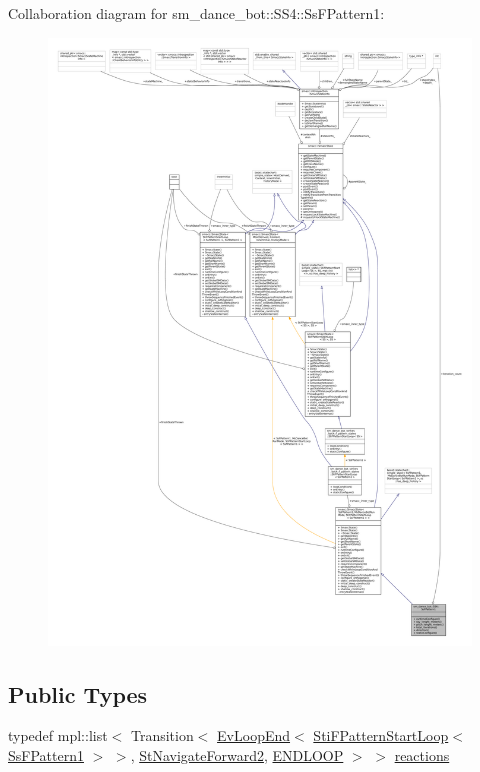Collaboration diagram for sm\+\_\+dance\+\_\+bot\+:\+:S\+S4\+:\+:Ss\+F\+Pattern1\+:
\nopagebreak
\begin{figure}[H]
\begin{center}
\leavevmode
\includegraphics[width=350pt]{structsm__dance__bot_1_1SS4_1_1SsFPattern1__coll__graph}
\end{center}
\end{figure}
\subsection*{Public Types}
\begin{DoxyCompactItemize}
\item 
typedef mpl\+::list$<$ Transition$<$ \hyperlink{structsmacc_1_1default__events_1_1EvLoopEnd}{Ev\+Loop\+End}$<$ \hyperlink{structsm__dance__bot_1_1f__pattern__states_1_1StiFPatternStartLoop}{Sti\+F\+Pattern\+Start\+Loop}$<$ \hyperlink{structsm__dance__bot_1_1SS4_1_1SsFPattern1}{Ss\+F\+Pattern1} $>$ $>$, \hyperlink{structsm__dance__bot_1_1StNavigateForward2}{St\+Navigate\+Forward2}, \hyperlink{structsmacc_1_1default__transition__tags_1_1ENDLOOP}{E\+N\+D\+L\+O\+OP} $>$ $>$ \hyperlink{structsm__dance__bot_1_1SS4_1_1SsFPattern1_a29f0e587dbea2e8668b0851d85f50c54}{reactions}
\end{DoxyCompactItemize}
